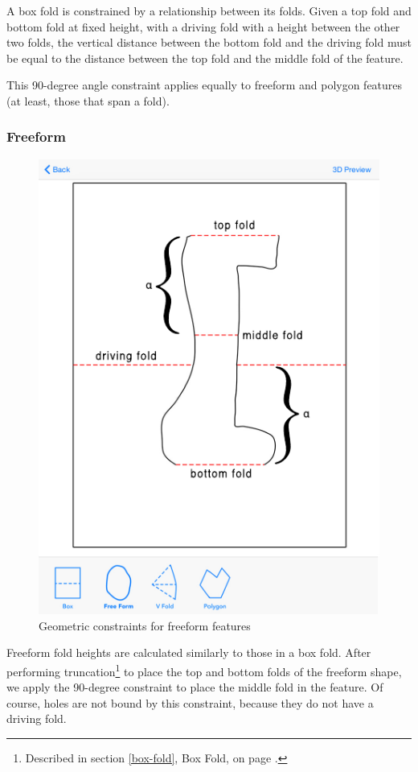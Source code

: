 A box fold is constrained by a relationship between its folds. Given a
top fold and bottom fold at fixed height, with a driving fold with a
height between the other two folds, the vertical distance between the
bottom fold and the driving fold must be equal to the distance between
the top fold and the middle fold of the feature.

This 90-degree angle constraint applies equally to freeform and polygon
features (at least, those that span a fold).

\subsubsection{Freeform}\label{freeform}

\begin{figure}[htbp]
\centering
\includegraphics{figures/45_Tech_Constraints/freeformConstraints.pdf}
\caption{Geometric constraints for freeform features}
\end{figure}

Freeform fold heights are calculated similarly to those in a box fold.
After performing truncation\footnote{Described in section
  \ref{box-fold}, Box Fold, on page \pageref{box-fold}.} to place the
top and bottom folds of the freeform shape, we apply the 90-degree
constraint to place the middle fold in the feature. Of course, holes are
not bound by this constraint, because they do not have a driving fold.

